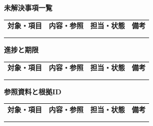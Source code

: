 \documentclass[11pt,a4paper]{article}
\begin{document}
\par{}\noindent\textbf{未解決事項一覧}\par\vspace{1mm}
{\fontsize{8.5}{13}\selectfont
\begin{tabularx}{\linewidth}{@{}XXXX@{}}
\textbf{対象・項目} & \textbf{内容・参照} & \textbf{担当・状態} & \textbf{備考}\\[2mm]
\strut & \strut & \strut & \strut\\[5mm]
\strut & \strut & \strut & \strut\\[5mm]
\end{tabularx}
}\vspace{2mm}\par
{}
\par{}\noindent\textbf{進捗と期限}\par\vspace{1mm}
{\fontsize{8.5}{13}\selectfont
\begin{tabularx}{\linewidth}{@{}XXXX@{}}
\textbf{対象・項目} & \textbf{内容・参照} & \textbf{担当・状態} & \textbf{備考}\\[2mm]
\strut & \strut & \strut & \strut\\[5mm]
\strut & \strut & \strut & \strut\\[5mm]
\end{tabularx}
}\vspace{2mm}\par
{}
\par{}\noindent\textbf{参照資料と根拠ID}\par\vspace{1mm}
{\fontsize{8.5}{13}\selectfont
\begin{tabularx}{\linewidth}{@{}XXXX@{}}
\textbf{対象・項目} & \textbf{内容・参照} & \textbf{担当・状態} & \textbf{備考}\\[2mm]
\strut & \strut & \strut & \strut\\[5mm]
\strut & \strut & \strut & \strut\\[5mm]
\end{tabularx}
}\vspace{2mm}\par
\end{document}
